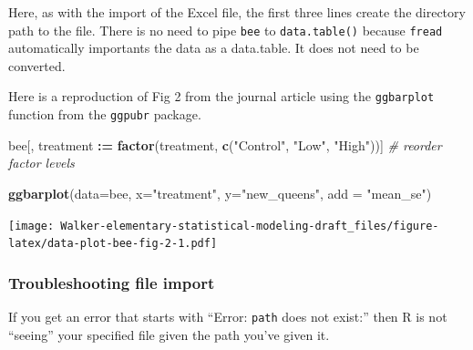 \documentclass[]{book}
\newenvironment{Shaded}{\begin{snugshade}}{\end{snugshade}}
\newcommand{\CommentTok}[1]{\textcolor[rgb]{0.56,0.35,0.01}{\textit{#1}}}
\newcommand{\DataTypeTok}[1]{\textcolor[rgb]{0.13,0.29,0.53}{#1}}
\newcommand{\ErrorTok}[1]{\textcolor[rgb]{0.64,0.00,0.00}{\textbf{#1}}}
\newcommand{\KeywordTok}[1]{\textcolor[rgb]{0.13,0.29,0.53}{\textbf{#1}}}
\newcommand{\NormalTok}[1]{#1}
\newcommand{\OperatorTok}[1]{\textcolor[rgb]{0.81,0.36,0.00}{\textbf{#1}}}
\newcommand{\StringTok}[1]{\textcolor[rgb]{0.31,0.60,0.02}{#1}}
\begin{document}
Here, as with the import of the Excel file, the first three lines create the directory path to the file. There is no need to pipe \texttt{bee} to \texttt{data.table()} because \texttt{fread} automatically importants the data as a data.table. It does not need to be converted.

Here is a reproduction of Fig 2 from the journal article using the \texttt{ggbarplot} function from the \texttt{ggpubr} package.

\begin{Shaded}
\begin{Highlighting}[]
\NormalTok{bee[, treatment }\OperatorTok{:}\ErrorTok{=}\StringTok{ }\KeywordTok{factor}\NormalTok{(treatment, }\KeywordTok{c}\NormalTok{(}\StringTok{"Control"}\NormalTok{, }\StringTok{"Low"}\NormalTok{, }\StringTok{"High"}\NormalTok{))] }\CommentTok{# reorder factor levels}

\KeywordTok{ggbarplot}\NormalTok{(}\DataTypeTok{data=}\NormalTok{bee,}
          \DataTypeTok{x=}\StringTok{"treatment"}\NormalTok{, }
          \DataTypeTok{y=}\StringTok{"new_queens"}\NormalTok{, }
          \DataTypeTok{add =} \StringTok{"mean_se"}\NormalTok{)}
\end{Highlighting}
\end{Shaded}

\texttt{[image: Walker-elementary-statistical-modeling-draft\_files/figure-latex/data-plot-bee-fig-2-1.pdf]}

\hypertarget{troubleshooting-file-import}{%
\subsubsection{Troubleshooting file import}\label{troubleshooting-file-import}}

If you get an error that starts with ``Error: \texttt{path} does not exist:'' then R is not ``seeing'' your specified file given the path you've given it.
\end{document}
